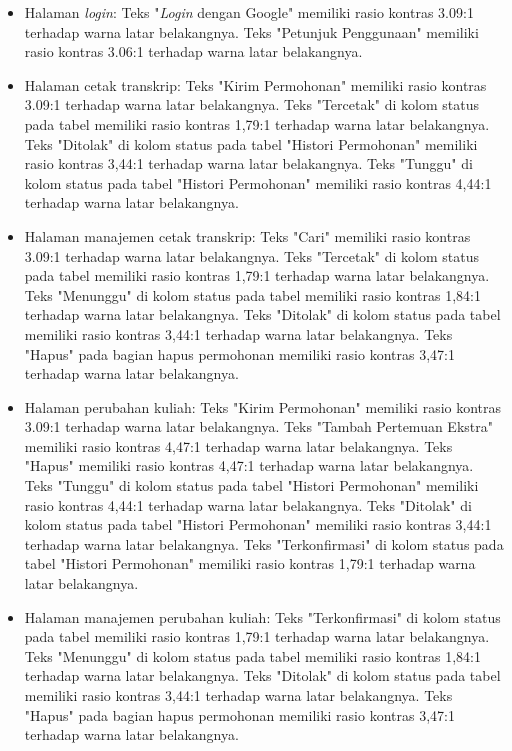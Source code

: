 \begin{itemize}
    \item Halaman \textit{login}: Teks "\textit{Login} dengan Google" memiliki rasio kontras 3.09:1 terhadap warna latar belakangnya. Teks "Petunjuk Penggunaan" memiliki rasio kontras 3.06:1 terhadap warna latar belakangnya.
    \item Halaman cetak transkrip: Teks "Kirim Permohonan" memiliki rasio kontras 3.09:1 terhadap warna latar belakangnya. Teks "Tercetak" di kolom status pada tabel memiliki rasio kontras 1,79:1 terhadap warna latar belakangnya. Teks "Ditolak" di kolom status pada tabel "Histori Permohonan" memiliki rasio kontras 3,44:1 terhadap warna latar belakangnya. Teks "Tunggu" di kolom status pada tabel "Histori Permohonan" memiliki rasio kontras 4,44:1 terhadap warna latar belakangnya.
    \item Halaman manajemen cetak transkrip: Teks "Cari" memiliki rasio kontras 3.09:1 terhadap warna latar belakangnya. Teks "Tercetak" di kolom status pada tabel memiliki rasio kontras 1,79:1 terhadap warna latar belakangnya. Teks "Menunggu" di kolom status pada tabel memiliki rasio kontras 1,84:1 terhadap warna latar belakangnya. Teks "Ditolak" di kolom status pada tabel memiliki rasio kontras 3,44:1 terhadap warna latar belakangnya. Teks "Hapus" pada bagian hapus permohonan memiliki rasio kontras 3,47:1 terhadap warna latar belakangnya.
    \item Halaman perubahan kuliah: Teks "Kirim Permohonan" memiliki rasio kontras 3.09:1 terhadap warna latar belakangnya. Teks "Tambah Pertemuan Ekstra" memiliki rasio kontras 4,47:1 terhadap warna latar belakangnya. Teks "Hapus" memiliki rasio kontras 4,47:1 terhadap warna latar belakangnya. Teks "Tunggu" di kolom status pada tabel "Histori Permohonan" memiliki rasio kontras 4,44:1 terhadap warna latar belakangnya. Teks "Ditolak" di kolom status pada tabel "Histori Permohonan" memiliki rasio kontras 3,44:1 terhadap warna latar belakangnya. Teks "Terkonfirmasi" di kolom status pada tabel "Histori Permohonan" memiliki rasio kontras 1,79:1 terhadap warna latar belakangnya.
    \item Halaman manajemen perubahan kuliah: Teks "Terkonfirmasi" di kolom status pada tabel memiliki rasio kontras 1,79:1 terhadap warna latar belakangnya. Teks "Menunggu" di kolom status pada tabel memiliki rasio kontras 1,84:1 terhadap warna latar belakangnya. Teks "Ditolak" di kolom status pada tabel memiliki rasio kontras 3,44:1 terhadap warna latar belakangnya. Teks "Hapus" pada bagian hapus permohonan memiliki rasio kontras 3,47:1 terhadap warna latar belakangnya.

\end{itemize}
